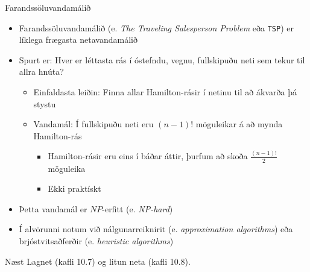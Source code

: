 \documentclass[handout]{beamer}
\begin{document}
\begin{frame}{Farandssöluvandamálið}
\begin{itemize}
 \item Farandssöluvandamálið (e. \emph{The Traveling Salesperson Problem} eða \texttt{TSP}) er líklega frægasta netavandamálið
 \item Spurt er: Hver er léttasta rás í óstefndu, vegnu, fullskipuðu neti sem tekur til allra hnúta? \pause
 \begin{itemize}
  \item Einfaldasta leiðin: Finna allar Hamilton-rásir í netinu til að ákvarða þá stystu
  \item Vandamál: Í fullskipuðu neti eru $(n-1)!$ möguleikar á að mynda Hamilton-rás
  \begin{itemize}
   \item Hamilton-rásir eru eins í báðar áttir, þurfum að skoða $\frac{(n-1)!}{2}$ möguleika
   \item Ekki praktískt
  \end{itemize}
 \end{itemize}
 \item Þetta vandamál er $NP$-erfitt (e. \emph{NP-hard})
 \item Í alvörunni notum við nálgunarreiknirit (e. \emph{approximation algorithms}) eða brjóstvitsaðferðir (e. \emph{heuristic algorithms})
\end{itemize}
\end{frame}


\begin{frame}{Næst}
Lagnet (kafli 10.7) og litun neta (kafli 10.8).
\end{frame}
\end{document}
